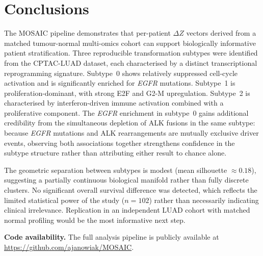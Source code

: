 \section{Conclusions}
\label{sec:conclusions}

The MOSAIC pipeline demonstrates that per-patient $\Delta Z$ vectors derived from a
matched tumour-normal multi-omics cohort can support biologically informative patient
stratification.
Three reproducible transformation subtypes were identified from the CPTAC-LUAD dataset,
each characterised by a distinct transcriptional reprogramming signature.
Subtype~0 shows relatively suppressed cell-cycle activation and is significantly
enriched for \textit{EGFR} mutations.
Subtype~1 is proliferation-dominant, with strong E2F and G2-M upregulation.
Subtype~2 is characterised by interferon-driven immune activation combined with a
proliferative component.
The \textit{EGFR} enrichment in subtype~0 gains additional credibility from the
simultaneous depletion of ALK fusions in the same subtype: because \textit{EGFR}
mutations and ALK rearrangements are mutually exclusive driver events, observing
both associations together strengthens confidence in the subtype structure rather than
attributing either result to chance alone.

The geometric separation between subtypes is modest (mean silhouette $\approx 0.18$),
suggesting a partially continuous biological manifold rather than fully discrete
clusters.
No significant overall survival difference was detected, which reflects the limited
statistical power of the study ($n = 102$) rather than necessarily indicating clinical
irrelevance.
Replication in an independent LUAD cohort with matched normal profiling would be the
most informative next step.

\bigskip
\noindent\textbf{Code availability.}
The full analysis pipeline is publicly available at
\url{https://github.com/ajanowiak/MOSAIC}.
